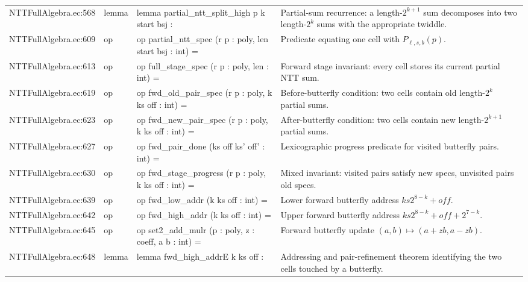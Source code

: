 \documentclass[10pt]{article}
\begin{document}
\begin{longtable}{L{0.11\textwidth}L{0.05\textwidth}L{0.38\textwidth}L{0.42\textwidth}}
NTTFullAlgebra.\allowbreak{}ec:\allowbreak{}568 & lemma & {\ttfamily\scriptsize lemma partial\_ntt\_split\_high p k start bsj :} & Partial-sum recurrence: a length-$2^{k+1}$ sum decomposes into two length-$2^k$ sums with the appropriate twiddle. \\
NTTFullAlgebra.\allowbreak{}ec:\allowbreak{}609 & op & {\ttfamily\scriptsize op partial\_ntt\_spec (r p : poly, len start bsj : int) =} & Predicate equating one cell with $P_{\ell,s,b}(p)$. \\
NTTFullAlgebra.\allowbreak{}ec:\allowbreak{}613 & op & {\ttfamily\scriptsize op full\_stage\_spec (r p : poly, len : int) =} & Forward stage invariant: every cell stores its current partial NTT sum. \\
NTTFullAlgebra.\allowbreak{}ec:\allowbreak{}619 & op & {\ttfamily\scriptsize op fwd\_old\_pair\_spec (r p : poly, k ks off : int) =} & Before-butterfly condition: two cells contain old length-$2^k$ partial sums. \\
NTTFullAlgebra.\allowbreak{}ec:\allowbreak{}623 & op & {\ttfamily\scriptsize op fwd\_new\_pair\_spec (r p : poly, k ks off : int) =} & After-butterfly condition: two cells contain new length-$2^{k+1}$ partial sums. \\
NTTFullAlgebra.\allowbreak{}ec:\allowbreak{}627 & op & {\ttfamily\scriptsize op fwd\_pair\_done (ks off ks' off' : int) =} & Lexicographic progress predicate for visited butterfly pairs. \\
NTTFullAlgebra.\allowbreak{}ec:\allowbreak{}630 & op & {\ttfamily\scriptsize op fwd\_stage\_progress (r p : poly, k ks off : int) =} & Mixed invariant: visited pairs satisfy new specs, unvisited pairs old specs. \\
NTTFullAlgebra.\allowbreak{}ec:\allowbreak{}639 & op & {\ttfamily\scriptsize op fwd\_low\_addr (k ks off : int) =} & Lower forward butterfly address $ks2^{8-k}+off$. \\
NTTFullAlgebra.\allowbreak{}ec:\allowbreak{}642 & op & {\ttfamily\scriptsize op fwd\_high\_addr (k ks off : int) =} & Upper forward butterfly address $ks2^{8-k}+off+2^{7-k}$. \\
NTTFullAlgebra.\allowbreak{}ec:\allowbreak{}645 & op & {\ttfamily\scriptsize op set2\_add\_mulr (p : poly, z : coeff, a b : int) =} & Forward butterfly update $(a,b)\mapsto(a+zb,a-zb)$. \\
NTTFullAlgebra.\allowbreak{}ec:\allowbreak{}648 & lemma & {\ttfamily\scriptsize lemma fwd\_high\_addrE k ks off :} & Addressing and pair-refinement theorem identifying the two cells touched by a butterfly. \\

\end{longtable}
\end{document}
